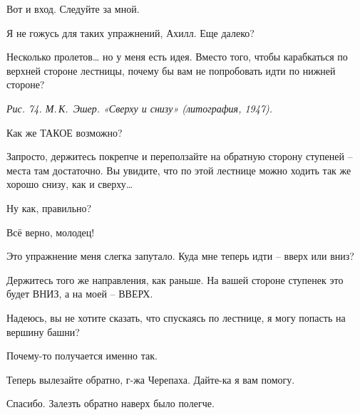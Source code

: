 \documentclass[../main.tex]{subfiles}
\begin{document}
\begin{Dialogue}

 Вот и вход. Следуйте за мной.


 Я не гожусь для таких упражнений, Ахилл. Еще далеко?

 Несколько пролетов\ldots{} но у меня есть идея. Вместо того, чтобы карабкаться по верхней стороне лестницы, почему бы вам не попробовать идти по нижней стороне?

\emph{Рис. 74. М.\,К.~Эшер. «Сверху и снизу» (литография, 1947).}

 Как же ТАКОЕ возможно?

 Запросто, держитесь покрепче и переползайте на обратную сторону ступеней \--- места там достаточно. Вы увидите, что по этой лестнице можно ходить так же хорошо снизу, как и сверху\ldots{}

 Ну как, правильно?

 Всё верно, молодец!

 Это упражнение меня слегка запутало. Куда мне теперь идти \--- вверх или вниз?

 Держитесь того же направления, как раньше. На вашей стороне ступенек это будет ВНИЗ, а на моей \--- ВВЕРХ.

 Надеюсь, вы не хотите сказать, что спускаясь по лестнице, я могу попасть на вершину башни?

 Почему-то получается именно так.


Теперь вылезайте обратно, г-жа Черепаха. Дайте-ка я вам помогу.


 Спасибо. Залезть обратно наверх было полегче.


\end{Dialogue}
\end{document}
